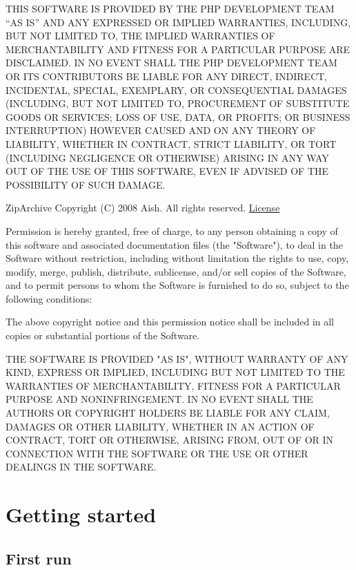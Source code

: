 \documentclass{tufte-book}
\newcommand{\licensetext}{\scriptsize \setlength{\parskip}{0mm} \singlespacing}
\begin{document}
\begin{fullwidth}
{THIS SOFTWARE IS PROVIDED BY THE PHP DEVELOPMENT TEAM ``AS IS'' AND 
ANY EXPRESSED OR IMPLIED WARRANTIES, INCLUDING, BUT NOT LIMITED TO,
THE IMPLIED WARRANTIES OF MERCHANTABILITY AND FITNESS FOR A 
PARTICULAR PURPOSE ARE DISCLAIMED.  IN NO EVENT SHALL THE PHP
DEVELOPMENT TEAM OR ITS CONTRIBUTORS BE LIABLE FOR ANY DIRECT, 
INDIRECT, INCIDENTAL, SPECIAL, EXEMPLARY, OR CONSEQUENTIAL DAMAGES 
(INCLUDING, BUT NOT LIMITED TO, PROCUREMENT OF SUBSTITUTE GOODS OR 
SERVICES; LOSS OF USE, DATA, OR PROFITS; OR BUSINESS INTERRUPTION)
HOWEVER CAUSED AND ON ANY THEORY OF LIABILITY, WHETHER IN CONTRACT,
STRICT LIABILITY, OR TORT (INCLUDING NEGLIGENCE OR OTHERWISE)
ARISING IN ANY WAY OUT OF THE USE OF THIS SOFTWARE, EVEN IF ADVISED
OF THE POSSIBILITY OF SUCH DAMAGE.}

ZipArchive Copyright (C) 2008 Aish. All rights reserved. \href{http://www.opensource.org/licenses/mit-license.php}{License}

{\licensetext 
Permission is hereby granted, free of charge, to any person obtaining a copy of this software and associated documentation files (the "Software"), to deal in the Software without restriction, including without limitation the rights to use, copy, modify, merge, publish, distribute, sublicense, and/or sell copies of the Software, and to permit persons to whom the Software is furnished to do so, subject to the following conditions:

The above copyright notice and this permission notice shall be included in all copies or substantial portions of the Software.

THE SOFTWARE IS PROVIDED "AS IS", WITHOUT WARRANTY OF ANY KIND, EXPRESS OR IMPLIED, INCLUDING BUT NOT LIMITED TO THE WARRANTIES OF MERCHANTABILITY, FITNESS FOR A PARTICULAR PURPOSE AND NONINFRINGEMENT. IN NO EVENT SHALL THE AUTHORS OR COPYRIGHT HOLDERS BE LIABLE FOR ANY CLAIM, DAMAGES OR OTHER LIABILITY, WHETHER IN AN ACTION OF CONTRACT, TORT OR OTHERWISE, ARISING FROM, OUT OF OR IN CONNECTION WITH THE SOFTWARE OR THE USE OR OTHER DEALINGS IN THE SOFTWARE.}

\end{fullwidth}

\chapter{Getting started}

\section{First run}
\end{document}
